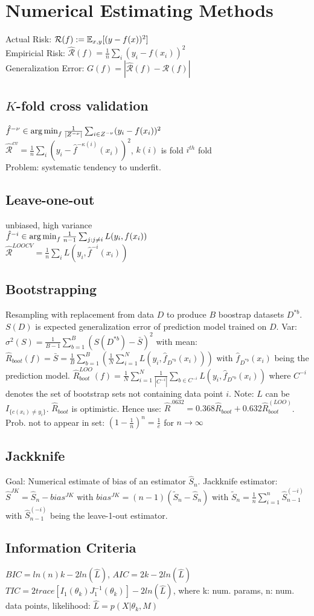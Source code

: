 \section{Numerical Estimating Methods}
Actual Risk: $\mathcal{R}(f) := \mathbb{E}_{x,y}[(y-f(x))^2]$ \\
Empiricial Risk: $\hat{\mathcal{R}}(f) = \frac{1}{n}\sum_i (y_i - f(x_i))^2$\\
Generalization Error: $G(f) = |\hat{\mathcal{R}}(f) - \mathcal{R}(f)|$
\subsection*{$K$-fold cross validation}
$\hat{f}^{-\nu} \in \operatorname*{arg\,min}_f \frac{1}{|Z^{-\nu}|} \sum_{i \in Z^{-\nu}} (y_i - f(x_i))^2$\\
$\hat{\mathcal{R}}^{cv} = \frac{1}{n} \sum_i(y_i - \hat{f}^{-\kappa(i)}(x_i))^2$, $k(i)$ is fold $i^{th}$ fold \\
Problem: systematic tendency to underfit.
\subsection*{Leave-one-out}
unbiased, high variance \\
$\hat{f}^{-i} \in \operatorname*{arg\,min}_f \frac{1}{n-1} \sum_{j:j \neq i} L(y_i,f(x_i))$ \\
$\hat{\mathcal{R}}^{LOOCV} = \frac{1}{n} \sum_i L(y_i, \hat{f}^{-i}(x_i))$
\subsection*{Bootstrapping}
Resampling with replacement from data $D$ to produce $B$ boostrap datasets $D^{*b}$.  $S(D)$ is expected generalization error of prediction model trained on $D$. Var: $\sigma ^2(S) = \frac{1}{B-1}\sum_{b=1}^B(S(D^{*b})-\bar{S})^2$ with mean: $\hat{R}_{boot}(f)=\bar{S}=\frac{1}{B}\sum_{b=1}^B(\frac{1}{N}\sum_{i=1}^NL(y_i,\hat{f}_{D^{*b}}(x_i)))$ with $\hat{f}_{D^{*b}}(x_i)$ being the prediction model. $\hat{R}_{boot}^{LOO}(f) = \frac{1}{N}\sum_{i=1}^N\frac{1}{|C^{-i}|}\sum_{b\in C^{-i}}L(y_i,\hat{f}_{D^{*b}}(x_i))$ where $C^{-i}$ denotes the set of bootstrap sets not containing data point $i$. Note: $L$ can be $I_{\{c(x_i)\not =y_i\}}$.
$\hat{R}_{boot}$ is optimistic. Hence use: $\hat{R}^{.0632}=0.368\hat{R}_{boot}+0.632\hat{R}_{boot}^{(LOO)}$. \\
Prob. not to appear in set: $(1-\frac{1}{n})^n = \frac{1}{e}$ for $n \rightarrow \infty$
\subsection*{Jackknife}
Goal: Numerical estimate of bias of an estimator $\hat{S}_n$. Jackknife estimator: $\hat{S}^{JK}=\hat{S}_n-bias^{JK}$ with $bias^{JK}=(n-1)(\tilde{S}_n-\hat{S}_n)$ with $\tilde{S}_n=\frac{1}{n}\sum_{i=1}^n\hat{S}^{(-i)}_{n-1}$ with $\hat{S}^{(-i)}_{n-1}$ being the leave-1-out estimator.
\subsection*{Information Criteria}
$BIC = ln(n)k - 2ln(\hat{L})$, $AIC = 2k - 2ln(\hat{L})$\\
$TIC = 2trace[I_1(\theta_k)J_1^{-1}(\theta_k)] - 2ln(\hat{L})$, 
where k: num. params, n: num. data points, likelihood: $\hat{L}=p(X|\theta_k,M)$  
